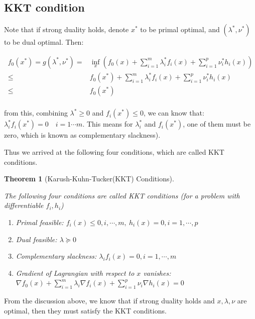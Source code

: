 \documentclass[
]{book}
\providecommand{\tightlist}{%
  \setlength{\itemsep}{0pt}\setlength{\parskip}{0pt}}
\newtheorem{theorem}{Theorem}[chapter]
\theoremstyle{definition}
\theoremstyle{definition}
\theoremstyle{definition}
\theoremstyle{definition}
\theoremstyle{remark}
\begin{document}
\subsection{KKT condition}\label{appconvex-theory-kkt}

Note that if strong duality holds, denote \(x^*\) to be primal optimal, and \((\lambda^*,\nu^*)\) to be dual optimal. Then:

\begin{equation}
  \begin{aligned}
  f_0(x^*) = g(\lambda^*,\nu^*) = & \inf_x(f_0(x)+\sum_{i=1}^m\lambda_i^*f_i(x)+\sum_{i=1}^p\nu_i^*h_i(x))\\
 \leq & f_0(x^*)+\sum_{i=1}^m\lambda_i^*f_i(x)+\sum_{i=1}^p\nu_i^*h_i(x)\\
 \leq & f_0(x^*)\\
  \end{aligned}
  \end{equation}

from this, combining \(\lambda^*\geq 0\) and \(f_i(x^*)\leq 0\), we can know that: \(\lambda_i^*f_i(x^*)=0\quad i=1\cdots m\). This means for \(\lambda_i^*\) and \(f_i(x^*)\), one of them must be zero, which is known as complementary slackness).

Thus we arrived at the following four conditions, which are called KKT conditions.

\begin{theorem}[Karush-Kuhn-Tucker(KKT) Conditions]
\protect\hypertarget{thm:KKT}{}\label{thm:KKT}

The following four conditions are called KKT conditions (for a problem with differentiable \(f_i,h_i\))

\begin{enumerate}
\def\labelenumi{\arabic{enumi}.}
\tightlist
\item
  Primal feasible: \(f_i(x) \leq 0,i,\cdots ,m,\ h_i(x) = 0,i=1,\cdots ,p\)
\item
  Dual feasible: \(\lambda\succeq0\)
\item
  Complementary slackness: \(\lambda_if_i(x)=0,i=1,\cdots,m\)
\item
  Gradient of Lagrangian with respect to \(x\) vanishes:\(\nabla f_0(x)+\sum_{i=1}^m\lambda_i\nabla f_i(x)+\sum_{i=1}^p\nu_i\nabla h_i(x) = 0\)
\end{enumerate}

\end{theorem}

From the discussion above, we know that if strong duality holds and \(x,\lambda,\nu\) are optimal, then they must satisfy the KKT conditions.
\end{document}
